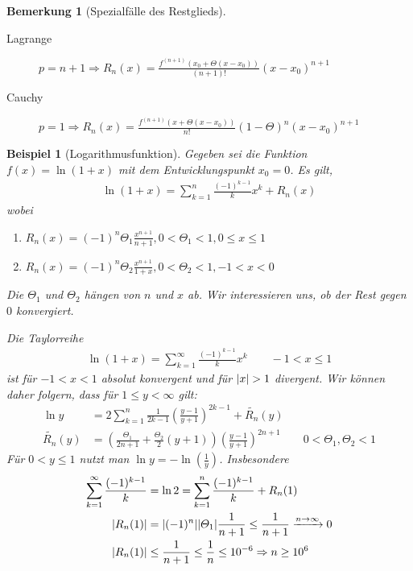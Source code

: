 \documentclass[ngerman,titlepage,twoside, parskip=half*]{scrreprt}
\theoremstyle{break}
\theoremstyle{nonumberbreak}
\newtheorem{remark}{Bemerkung}
\newtheorem{beispiel}{Beispiel}
\DeclarePairedDelimiter{\abs}{\lvert}{\rvert}
\begin{document}
\begin{remark}[Spezialfälle des Restglieds]
  \begin{description}
  \item[Lagrange] $p=n+1\Rightarrow
    R_n(x)=\frac{f^{(n+1)}(x_0+\Theta(x-x_0))}{(n+1)!}(x-x_0)^{n+1}$%
  \item[Cauchy] $p=1\Rightarrow
    R_n(x)=\frac{f^{(n+1)}(x+\Theta(x-x_0))}{n!}(1-\Theta)^n(x-x_0)^{n+1}$%
  \end{description}
\end{remark}

\begin{beispiel}[Logarithmusfunktion]
  Gegeben sei die Funktion $f(x)=\ln(1+x)$ mit dem Entwicklungspunkt
  $x_0=0$. Es gilt,
  \begin{gather}\label{eq:y2}
    \ln(1+x)=\sum_{k=1}^n \frac{(-1)^{k-1}}{k}x^k+R_n(x)
  \end{gather}
  wobei
  \begin{enumerate}
  \item $R_n(x)=(-1)^n\Theta_1\frac{x^{n+1}}{n+1}, 0<\Theta_1<1, 0\leq x\leq 1$
  \item $R_n(x)=(-1)^n\Theta_2\frac{x^{n+1}}{1+x}, 0<\Theta_2<1, -1<x<0$
  \end{enumerate}
  Die $\Theta_1$ und $\Theta_2$ hängen von $n$ und $x$ ab. Wir
  interessieren uns, ob der Rest gegen $0$ konvergiert.

  Die Taylorreihe
  \begin{gather*}
    \ln(1+x)=\sum_{k=1}^\infty \frac{(-1)^{k-1}}{k}x^k\qquad -1<x\leq
    1
  \end{gather*}
  ist für $-1<x<1$ absolut konvergent und für $\abs{x}>1$
  divergent. Wir können daher folgern, dass für $1\leq y<\infty$ gilt: 
  \begin{align*}
    \ln y &= 2\sum_{k=1}^n \frac{1}{2k-1}
    \left(\frac{y-1}{y+1}\right)^{2k-1} +\widetilde{R_n}(y)\\
    \widetilde{R_n}(y) &= \left(\frac{\Theta_1}{2n+1}+
      \frac{\Theta_2}{2} (y+1)\right) \left(\frac{y-1}{y+
        1}\right)^{2n+1}\qquad 0<\Theta_1,\Theta_2<1
  \end{align*}
  Für $0<y\leq 1$ nutzt man $\ln y= -\ln(\frac{1}{y})$. Insbesondere
  \begin{align*}
    \sum_{k=1}^\infty \frac{(-1)^{k-1}}{k} &=\ln 2=\sum_{k=1}^n
    \frac{(-1)^{k-1}}{k}+R_n(1)\\
    \abs{R_n(1)} &= \abs{(-1)^n} \abs{\Theta_1} \frac{1}{n+1} \leq
    \frac{1}{n+1}
    \xrightarrow{n\rightarrow\infty}0\\
    \abs{R_n(1)} &\leq \frac{1}{n+1}\leq \frac{1}{n}\leq 10^{-6}
    \Rightarrow n\geq 10^6
  \end{align*}


\end{beispiel}
\end{document}
